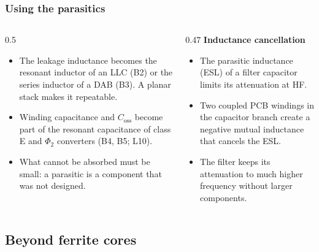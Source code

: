 \begin{frame}
	\frametitle{Using the parasitics}
	\begin{columns}[T]
		\begin{column}{0.5\textwidth}
			\small
			\begin{itemize}
				\item The leakage inductance becomes the resonant inductor of an LLC (B2) or the series inductor of a DAB (B3). A planar stack makes it repeatable.
				\item Winding capacitance and $C_\mathrm{oss}$ become part of the resonant capacitance of class E and $\Phi_2$ converters (B4, B5; L10).
				\item What cannot be absorbed must be small: a parasitic is a component that was not designed.
			\end{itemize}
		\end{column}
		\begin{column}{0.47\textwidth}
			\small
			\textbf{Inductance cancellation}
			\begin{itemize}
				\item The parasitic inductance (ESL) of a filter capacitor limits its attenuation at HF.
				\item Two coupled PCB windings in the capacitor branch create a negative mutual inductance that cancels the ESL.
				\item The filter keeps its attenuation to much higher frequency without larger components.
			\end{itemize}
		\end{column}
	\end{columns}
\end{frame}

\subsection{Beyond ferrite cores}

